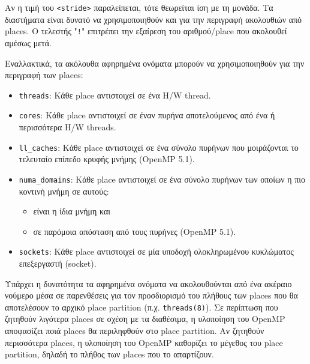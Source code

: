
Αν η τιμή του \texttt{<stride>} παραλείπεται, τότε θεωρείται ίση με τη μονάδα. Τα διαστήματα είναι δυνατό να χρησιμοποιηθούν και για την περιγραφή ακολουθιών από places. Ο τελεστής "\texttt{!}" επιτρέπει την εξαίρεση του αριθμού/place που ακολουθεί αμέσως μετά.

\noindent Εναλλακτικά, τα ακόλουθα αφηρημένα ονόματα μπορούν να χρησιμοποιηθούν για την περιγραφή των places:
\begin{itemize}
	\item \texttt{threads}: Κάθε place αντιστοιχεί σε ένα H/W thread.
	\item \texttt{cores}: Κάθε place αντιστοιχεί σε έναν πυρήνα αποτελούμενος από ένα ή περισσότερα H/W threads.
	\item \texttt{ll\_caches}: Κάθε place αντιστοιχεί σε ένα σύνολο πυρήνων που μοιράζονται το τελευταίο επίπεδο κρυφής μνήμης (OpenMP 5.1).
	\item \texttt{numa\_domains}: Κάθε place αντιστοιχεί σε ένα σύνολο πυρήνων των οποίων η πιο κοντινή μνήμη σε αυτούς:
	\begin{itemize}
		\item είναι η ίδια μνήμη και %
		\item σε παρόμοια απόσταση από τους πυρήνες (OpenMP 5.1).
	\end{itemize}
	\item \texttt{sockets}: Κάθε place αντιστοιχεί σε μία υποδοχή ολοκληρωμένου κυκλώματος επεξεργαστή (socket).
\end{itemize}

Υπάρχει η δυνατότητα τα αφηρημένα ονόματα να ακολουθούνται από ένα ακέραιο νούμερο μέσα σε παρενθέσεις για τον προσδιορισμό του πλήθους των places που θα αποτελέσουν το αρχικό place partition (π.χ. \texttt{threads(8)}). Σε περίπτωση που ζητηθούν λιγότερα places σε σχέση με τα διαθέσιμα, η υλοποίηση του OpenMP αποφασίζει ποιά places θα περιληφθούν στο place partition. Αν ζητηθούν περισσότερα places, η υλοποίηση του OpenMP καθορίζει το μέγεθος του place partition, δηλαδή το πλήθος των places που το απαρτίζουν.

